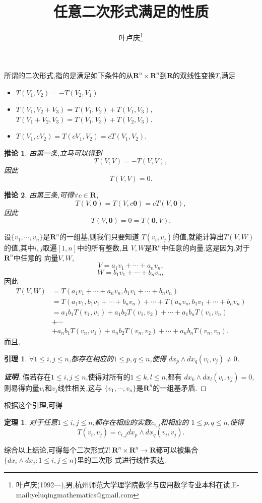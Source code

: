 \documentclass[a4paper]{article}
\newtheorem*{theo}{定理}
\newtheorem*{lem}{引理}
\newtheorem{coro}{推论}
\newenvironment{corollary}
{\bigskip\begin{mdframed}\begin{coro}}
    {\end{coro}\end{mdframed}\bigskip}
\newenvironment{theorem}
{\bigskip\begin{mdframed}\begin{theo}}
    {\end{theo}\end{mdframed}\bigskip}
\newenvironment{lemma}
{\bigskip\begin{mdframed}\begin{lem}}
    {\end{lem}\end{mdframed}\bigskip}
\begin{document}
\title{\huge{\bf{任意二次形式满足的性质}}} \author{\small{叶卢庆\footnote{叶卢庆(1992---),男,杭州师范大学理学院数学与应用数学专业本科在读,E-mail:yeluqingmathematics@gmail.com}}}
\maketitle
所谓的二次形式,指的是满足如下条件的从$\mathbf{R}^n\times\mathbf{R}^n$到$\mathbf{R}$的双线性变换$T$,满足
\begin{itemize}
\item $T(V_1,V_2)=-T(V_2,V_1)$
\item $T(V_1,V_2+V_3)=T(V_1,V_2)+T(V_1,V_3)$,$T(V_1+V_2,V_3)=T(V_1,V_3)+T(V_2,V_3)$.
\item $T(V_1,cV_2)=T(cV_1,V_2)=cT(V_1,V_2)$.
\end{itemize}
\begin{corollary}
由第一条,立马可以得到
$$
T(V,V)=-T(V,V),
$$
因此
$$
T(V,V)=0.
$$  
\end{corollary}
\begin{corollary}
由第三条,可得$\forall c\in \mathbf{R}$,
$$
T(V,\mathbf{0})=T(V,c\mathbf{0})=cT(V,\mathbf{0}),
$$
因此
$$
T(V,\mathbf{0})=0=T(\mathbf{0},V).
$$
\end{corollary}
设$\{v_1,\cdots,v_n\}$是$\mathbf{R}^n$的一组基,则我们只要知道
$T(v_i,v_j)$的值,就能计算出$T(V,W)$的值,其中$i,j$取遍$[1,n]$中的所有整数,且
$V,W$是$\mathbf{R}^n$中任意的向量.这是因为,对于$\mathbf{R}^n$中任意的
向量$V,W$,
$$
V=a_1v_1+\cdots+a_nv_n,
$$
$$
W=b_1v_1+\cdots+b_nv_n,
$$
因此
\begin{align*}
  T(V,W)&=T(a_1v_1+\cdots+a_nv_n,b_1v_1+\cdots+b_nv_n)
\\&=T(a_1v_1,b_1v_1+\cdots+b_nv_n)+\cdots+T(a_nv_n,b_1v_1+\cdots+b_nv_n)
\\&=a_1b_{1}T(v_1,v_1)+a_{1}b_{2}T(v_1,v_2)+\cdots+a_{1}b_{n}T(v_1,v_n)
\\&+\cdots
\\&+a_{n}b_{1}T(v_n,v_1)+a_{n}b_{2}T(v_n,v_2)+\cdots+a_{n}b_{n}T(v_n,v_n).
\end{align*}
而且,
\begin{lemma}
$\forall 1\leq i,j\leq n$,都存在相应的$1\leq p,q\leq n$,使得
$dx_p\wedge dx_q(v_i,v_j)\neq 0$.
\end{lemma}
\begin{proof}[\textbf{证明}]
假若存在$1\leq i,j\leq n$,使得对所有的$1\leq k,l\leq n$,都有
$dx_k\wedge dx_l(v_i,v_j)=0$,则易得向量$v_{i}$和$v_j$线性相关,这与
$\{v_1,\cdots,v_n\}$是$\mathbf{R}^n$的一组基矛盾.
\end{proof}
根据这个引理,可得
\begin{theorem}
对于任意$1\leq i,j\leq n$,都存在相应的实数$c_{i,j}$和相应的
$1\leq p,q\leq n$,使得
$$
T(v_i,v_j)=c_{i,j}dx_p\wedge dx_q(v_i,v_j).
$$
\end{theorem}
综合以上结论,可得每个二次形式$T:\mathbf{R}^n\times \mathbf{R}^n\to
\mathbf{R}$都可以被集合$\{dx_i\wedge dx_j:1\leq i,j\leq n\}$里的二次形
式进行线性表达.
\end{document}
